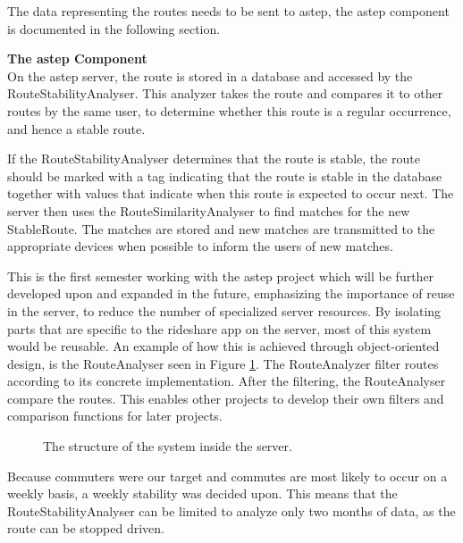 The data representing the routes needs to be sent to \gls{astep}, the \gls{astep} component is documented in the following section.

\textbf{The \gls{astep} Component}\\
On the \gls{astep} server, the route is stored in a database and accessed by the RouteStabilityAnalyser.
This analyzer takes the route and compares it to other routes by the same user, to determine whether this route is a regular occurrence, and hence a stable route.

If the RouteStabilityAnalyser determines that the route is stable, the route should be marked with a tag indicating that the route is stable in the database together with values that indicate when this route is expected to occur next.
The server then uses the RouteSimilarityAnalyser to find matches for the new StableRoute.
The matches are stored and new matches are transmitted to the appropriate devices when possible to inform the users of new matches.


This is the first semester working with the \gls{astep} project which will be further developed upon and expanded in the future, emphasizing the importance of reuse in the server, to reduce the number of specialized server resources.
By isolating parts that are specific to the rideshare app on the server, most of this system would be reusable.
An example of how this is achieved through object-oriented design, is the RouteAnalyser seen in Figure \ref{fig:classDiagramSprint1Server}.
The RouteAnalyzer filter routes according to its concrete implementation.
After the filtering, the RouteAnalyser compare the routes.
This enables other projects to develop their own filters and comparison functions for later projects.

\begin{figure}[h!]
	\centering
	
	\caption{The structure of the system inside the server.}
	\label{fig:classDiagramSprint1Server}
\end{figure}

Because commuters were our target and commutes are most likely to occur on a weekly basis, a weekly stability was decided upon.
This means that the RouteStabilityAnalyser can be limited to analyze only two months of data, as the route can be stopped driven.